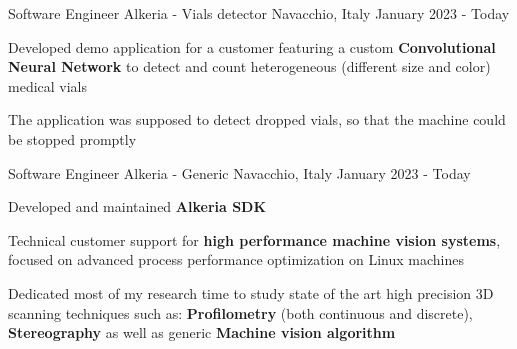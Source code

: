 \begin{cventries}
  \cventry
    {Software Engineer} %
    {Alkeria - Vials detector} %
    {Navacchio, Italy} %
    {January 2023 - Today} %
    {
      \begin{cvitems} %
        \item {Developed demo application for a customer featuring a custom \textbf{Convolutional Neural Network} to detect and count
        heterogeneous (different size and color) medical vials}
        \item {The application was supposed to detect dropped vials, so that the machine could be stopped promptly}
      \end{cvitems}
    }

  \cventry
    {Software Engineer} %
    {Alkeria - Generic} %
    {Navacchio, Italy} %
    {January 2023 - Today} %
    {
      \begin{cvitems} %
        \item {Developed and maintained \textbf{Alkeria SDK}}
        \item {Technical customer support for \textbf{high performance machine vision systems}, focused on advanced process performance optimization on Linux machines}
        \item {Dedicated most of my research time to study state of the art high precision 3D scanning techniques such as: \textbf{Profilometry} (both continuous and discrete), \textbf{Stereography}
        as well as generic \textbf{Machine vision algorithm}}
      \end{cvitems}
    }


\end{cventries}
